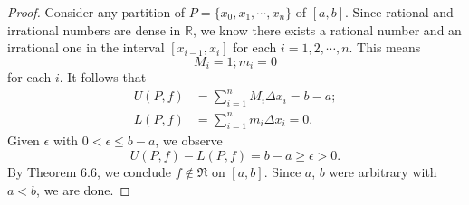 \begin{Exercise}
	\begin{proof}
		Consider any partition of $P = \{x_0, x_1, \cdots, x_n\}$ of $[a,b]$.
		Since rational and irrational numbers are dense in $\mathbb{R}$, we know there exists a rational number and an irrational one in the interval $[x_{i-1}, x_i]$ for each $i = 1,2,\cdots, n$.
		This means
		$$
		M_i = 1; m_i = 0
		$$
		for each $i$.
		It follows that
		\begin{align*}
		U(P,f) &= \sum_{i=1}^{n} M_i\Delta x_i = b-a; \\
		L(P,f) &= \sum_{i=1}^{n} m_i\Delta x_i = 0.
		\end{align*}
		Given $\epsilon$ with $0 < \epsilon \leq b-a$, we observe
		$$
		U(P,f) - L(P,f) = b-a \geq \epsilon > 0.
		$$
		By Theorem 6.6, we conclude $f\notin \mathfrak{R}$ on $[a,b]$.
		Since $a$, $b$ were arbitrary with $a<b$, we are done.
	\end{proof}
\end{Exercise}
